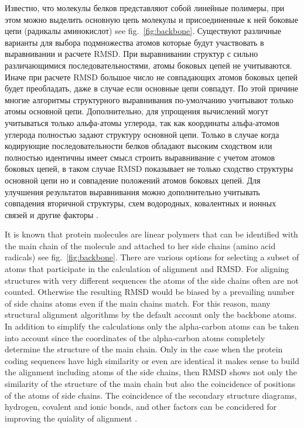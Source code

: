 \documentclass[a4paper, 12pt, titlepage, utf8]{extarticle}
\newcommand{\lookat}[1]{see fig.~\ref{#1}}
\begin{document}
\begin{original}
Известно, что молекулы белков представляют собой линейные полимеры, при этом
можно выделить основную цепь молекулы и присоединенные к ней боковые цепи
(радикалы аминокислот) \lookat{fig:backbone}. Существуют различные варианты для
выбора подмножества атомов которые будут участвовать в выравнивании и расчете
RMSD. При выравнивании структур с сильно различающимися последовательностями,
атомы боковых цепей не учитываются. Иначе при расчете RMSD большое число не
совпадающих атомов боковых цепей будет преобладать, даже в случае если основные
цепи совпадут. По этой причине многие алгоритмы структурного выравнивания
по-умолчанию учитывают только атомы основной цепи. Дополнительно, для упрощения
вычислений могут учитываться только альфа-атомы углерода, так как координаты
альфа-атомов углерода полностью задают структуру основной цепи. Только в случае
когда кодирующие последовательности белков обладают высоким сходством или
полностью идентичны имеет смысл строить выравнивание с учетом атомов боковых
цепей, в таком
случае RMSD показывает не только сходство структуры основной цепи но и
совпадение положений атомов боковых цепей. Для улучшения результатов
выравнивания можно дополнительно учитывать совпадения вторичной структуры, схем
водородных, ковалентных и ионных связей и другие факторы \cite{wiki-3}.
\end{original}

It is known that protein molecules are linear polymers that can be identified
with the main chain of the molecule and attached to her side chains (amino acid
radicals) \lookat{fig:backbone}. There are various options for selecting a
subset of atoms that participate in the calculation of alignment and RMSD. For
aligning structures with very different sequences the atoms of the side chains
often are not counted. Otherwise the resulting RMSD would be biased by a
prevailing number of side chains atoms even if the main chains match. For this
reason, many structural alignment algorithms by the default account only the
backbone atoms. In addition to simplify the calculations only the alpha-carbon
atoms can be taken into account since the coordinates of the alpha-carbon atoms
completely determine the structure of the main chain. Only in the case when the
protein coding sequences have high similarity or even are identical it makes
sense to build the alignment including atoms of the side chains, then  RMSD
shows not
only the similarity of the structure of the main chain but also the coincidence
of positions of the atoms of side chains. The coincidence of the secondary
structure diagrams, hydrogen, covalent and ionic bonds, and other factors can be
concidered for improving the quiality of alignment \cite {wiki-3}.
\end{document}
